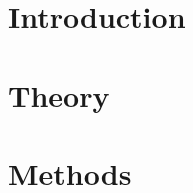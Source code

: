 \documentclass[
  10pt,
  b5paper,
  oneside
]{thesis}
\begin{document}
  
  \frontmatter
    
    
  \mainmatter
    
    \chapter{Introduction}
      

    \chapter{Theory}
      
      
      
      
      
      
 
    \chapter{Methods}
      



  \backmatter
    
    \begin{appendices}
      
    \end{appendices}
    
\end{document}
